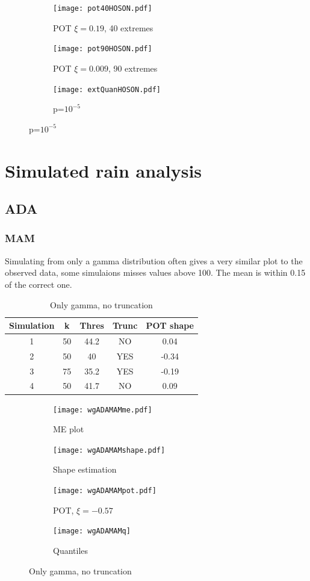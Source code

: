 \documentclass{article}
\begin{document}
	\begin{figure}[H]
		\centering
		\begin{subfigure}{0.33\textwidth}
			\texttt{[image: pot40HOSON.pdf]}
			\caption{POT $\xi = 0.19$, 40 extremes}
		\end{subfigure}%
		\begin{subfigure}{0.33\textwidth}
			\texttt{[image: pot90HOSON.pdf]}
			\caption{POT $\xi = 0.009$, 90 extremes}
		\end{subfigure}%
		\begin{subfigure}{0.33\textwidth}
			\texttt{[image: extQuanHOSON.pdf]}
			\caption{p=$10^{-5}$}
		\end{subfigure}
	\end{figure}


	\section{Simulated rain analysis}
	\subsection{ADA}
	\subsubsection{MAM}
	Simulating from only a gamma distribution often gives a very similar plot to the observed data, some simulaions misses values above 100. The mean is within 0.15 of the correct one.
	
	\begin{table}[H]
		\centering
	\begin{tabular}{|c|c|c|c|c|}
		\hline
		Simulation & k & Thres & Trunc & POT shape \\
		\hline
		1 & 50 & 44.2 &  NO & 0.04 \\
		2 & 50 & 40 & YES & -0.34 \\
		3 & 75 & 35.2 & YES & -0.19 \\
		4 & 50 & 41.7 & NO & 0.09 \\
	\end{tabular}
	\caption{Only gamma, no truncation}
	\end{table}
	
	\begin{figure}[H]
		\centering
		\begin{subfigure}{0.5\textwidth}
			\texttt{[image: wgADAMAMme.pdf]}
			\caption{ME plot}
		\end{subfigure}%
		\begin{subfigure}{0.5\textwidth}
			\texttt{[image: wgADAMAMshape.pdf]}
			\caption{Shape estimation}
		\end{subfigure}
		\begin{subfigure}{0.5\textwidth}
			\texttt{[image: wgADAMAMpot.pdf]}
			\caption{POT, $\xi =-0.57$}
		\end{subfigure}%
		\begin{subfigure}{0.5\textwidth}
			\texttt{[image: wgADAMAMq]}
			\caption{Quantiles}
		\end{subfigure}
	\caption{Only gamma, no truncation}
	\end{figure}
\end{document}
